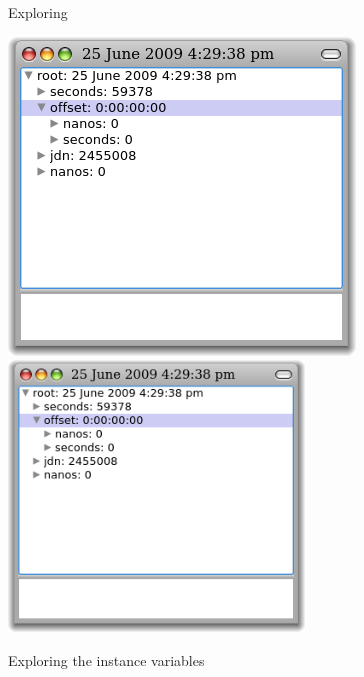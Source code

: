 \documentclass[a4paper,10pt,twoside]{book}
\begin{document}
\begin{figure}[tbp]
\begin{minipage}{0.48\textwidth}
\begin{center}
	\end{center}
	\caption{Exploring }
\end{minipage}
\hfill
\begin{minipage}{0.48\textwidth}
	\begin{center}
	\ifluluelse
		{\includegraphics[width=\textwidth]{exploreTimeStampNow2}}
		{\includegraphics[width=0.7\textwidth]{exploreTimeStampNow2}}
	\end{center}
	\caption{Exploring the instance variables}
\end{minipage}
\end{figure}
\end{document}

